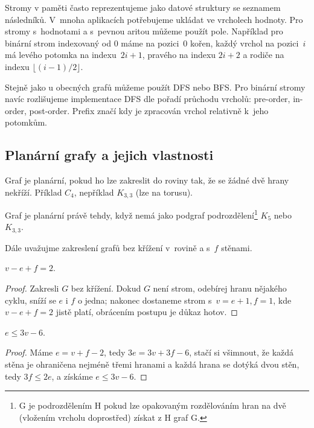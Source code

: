 Stromy v paměti často reprezentujeme jako datové struktury se seznamem
následníků. V~mnoha aplikacích potřebujeme ukládat ve vrcholech hodnoty.
Pro stromy s~hodnotami a s~pevnou aritou můžeme použít pole.
Například pro binární strom indexovaný od 0 máme na pozici~$0$ kořen,
každý vrchol na pozici~$i$ má levého potomka na indexu~$2i+1$, pravého
na indexu $2i+2$ a rodiče na indexu $\lfloor (i - 1) / 2 \rfloor$.

Stejně jako u obecných grafů můžeme použít DFS nebo BFS. Pro binární
stromy navíc rozlišujeme implementace DFS dle pořadí průchodu vrcholů:
pre-order, in-order, post-order. Prefix značí kdy je zpracován vrchol
relativně k~jeho potomkům.

\subsection{Planární grafy a jejich vlastnosti}

Graf je planární, pokud ho lze zakreslit do roviny tak, že se žádné dvě
hrany nekříží. Příklad $C_4$, nepříklad $K_{3,3}$ (lze na torusu).

\begin{theorem}[Kuratowski]
Graf je planární právě tehdy, když nemá jako podgraf
podrozdělení\footnote{G je podrozdělením H pokud lze opakovaným
rozdělováním hran na dvě (vložením vrcholu doprostřed) získat z H graf
G.} $K_5$ nebo $K_{3,3}$.
\end{theorem}

Dále uvažujme zakreslení grafů bez křížení v~rovině a s~$f$
stěnami.

\begin{theorem}[Euler]
$v - e + f = 2$.
\end{theorem}

\begin{proof}
Zakresli $G$ bez křížení.  Dokud
$G$ není strom, odebírej hranu nějakého cyklu, sníží se $e$ i $f$ o
jedna; nakonec dostaneme strom s~$v = e + 1, f = 1$, kde $v - e + f = 2$
jistě platí, obrácením postupu je důkaz hotov.
\end{proof}

\begin{corollary}
$e \leq 3v - 6$.
\end{corollary}

\begin{proof}
Máme $e = v + f - 2$, tedy $3e = 3v + 3f -
6$, stačí si všimnout, že každá stěna je ohraničena nejméně třemi
hranami a každá hrana se dotýká dvou stěn, tedy $3f \leq 2e$,
a získáme $e \leq 3v - 6$.
\end{proof}

